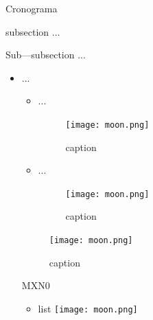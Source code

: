 \documentclass[12pt,letterpaper]{article}
\begin{document}
{  \newpage
  \begin{section}
  {\color{kblue} Cronograma}

    \begin{subsection}
    {\color{kgreen}subsection ...}
    \end{subsection}

    \begin{subsubsection}
    {\color{kgray}Sub---subsection ...}
    \end{subsubsection}

    \begin{itemize}
	\item[\ding{229}]{...}

	\begin{itemize}
	    \item[\ding{237}]{...
		\begin{figure}[htb]
		    \centering
		    \texttt{[image: moon.png]}
		    \caption{caption}
		    \label{luna}
		\end{figure}
	    }
	\end{itemize}

	\begin{itemize}
	    \item[\ding{237}]{...
		\begin{figure}[htb]
		    \centering
		    \texttt{[image: moon.png]}
		    \caption{caption}
		    \label{luna}
		\end{figure}
	    }
	\end{itemize}

	\begin{figure}[htb]
	    \centering
	    \texttt{[image: moon.png]}
	    \caption{caption}
	    \label{luna}
	\end{figure}
	
	\footnotesize{\scshape{
	  \begin{invoice}{MXN}{0}
	    
	  \end{invoice}
	    }%
	  }%
	  
	\begin{itemize}
	\item[\ding{182}]{ list  \texttt{[image: moon.png]}}
	\end{itemize}
    \end{itemize}
  \end{section}

}
\end{document}

